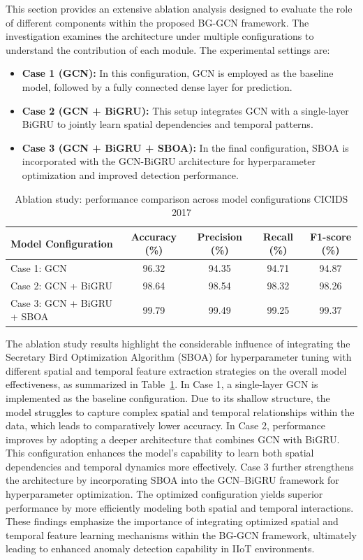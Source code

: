 \documentclass[a4paper,fleqn]{cas-sc}
\begin{document}
This section provides an extensive ablation analysis designed to evaluate the role of different components within the proposed BG-GCN framework. The investigation examines the architecture under multiple configurations to understand the contribution of each module. The experimental settings are:
\begin{itemize}
\item \textbf{Case 1 (GCN):} In this configuration, GCN is employed as the baseline model, followed by a fully connected dense layer for prediction.
\item \textbf{Case 2 (GCN + BiGRU):} This setup integrates GCN with a single-layer BiGRU to jointly learn spatial dependencies and temporal patterns.
\item \textbf{Case 3 (GCN + BiGRU + SBOA):} In the final configuration, SBOA is incorporated with the GCN-BiGRU architecture for hyperparameter optimization and improved detection performance.
\end{itemize}

\begin{table}[htbp]
\caption{Ablation study: performance comparison across model configurations CICIDS 2017}\label{tab:t11}
\centering
\begin{tabular}{@{}lcccc@{}}
\toprule
Model Configuration & Accuracy (\%) & Precision (\%) & Recall (\%) & F1-score (\%) \\
\midrule
Case 1: GCN & 96.32 & 94.35 & 94.71 & 94.87 \\
Case 2: GCN + BiGRU & 98.64 & 98.54 & 98.32 & 98.26 \\
Case 3: GCN + BiGRU + SBOA & 99.79 & 99.49 & 99.25 & 99.37 \\
\bottomrule
\end{tabular}
\end{table}

The ablation study results highlight the considerable influence of integrating the Secretary Bird Optimization Algorithm (SBOA) for hyperparameter tuning with different spatial and temporal feature extraction strategies on the overall model effectiveness, as summarized in Table~\ref{tab:t11}. In Case 1, a single-layer GCN is implemented as the baseline configuration. Due to its shallow structure, the model struggles to capture complex spatial and temporal relationships within the data, which leads to comparatively lower accuracy.
In Case 2, performance improves by adopting a deeper architecture that combines GCN with BiGRU. This configuration enhances the model’s capability to learn both spatial dependencies and temporal dynamics more effectively. Case 3 further strengthens the architecture by incorporating SBOA into the GCN–BiGRU framework for hyperparameter optimization. The optimized configuration yields superior performance by more efficiently modeling both spatial and temporal interactions.
These findings emphasize the importance of integrating optimized spatial and temporal feature learning mechanisms within the BG-GCN framework, ultimately leading to enhanced anomaly detection capability in IIoT environments.
\end{document}
